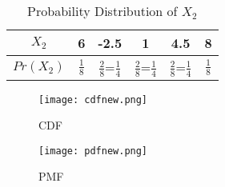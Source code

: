 \documentclass[11pt,a4paper,twocolumn]{article}
\begin{document}
\begin{table}[h!]
    \centering
    \begin{tabular}{|c|c|c|c|c|c|}
    \hline
         $X_{2}$&6&-2.5&1&4.5&8  \\[5pt]
         \hline
         $Pr(X_{2})$&$\frac{1}{8}$&$\frac{2}{8}$=$\frac{1}{4}$&$\frac{2}{8}$=$\frac{1}{4}$&$\frac{2}{8}$=$\frac{1}{4}$&$\frac{1}{8}$\\[5pt]
         \hline
    \end{tabular}
    \caption{Probability Distribution of $X_{2}$}
\end{table}
\begin{figure}[h!]
    \centering
    \texttt{[image: cdfnew.png]}
    \caption{CDF}
\end{figure}
\begin{figure}[h!]
    \centering
    \texttt{[image: pdfnew.png]}
    \caption{PMF}
\end{figure}
\end{document}
